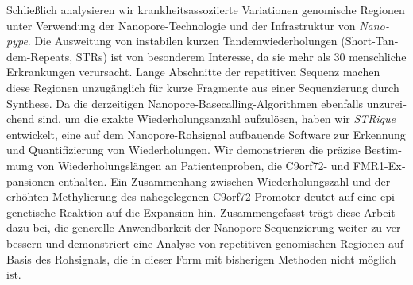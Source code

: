 \begin{otherlanguage}{german}
Schließlich analysieren wir krankheitsassoziierte Variationen genomische Regionen unter Verwendung der Nanopore-Technologie und der Infrastruktur von \textit{Nanopype}.
Die Ausweitung von instabilen kurzen Tandemwiederholungen (Short-Tandem-Repeats, STRs) ist von besonderem Interesse, da sie mehr als 30 menschliche Erkrankungen verursacht.
Lange Abschnitte der repetitiven Sequenz machen diese Regionen unzugänglich für kurze Fragmente aus einer Sequenzierung durch Synthese.
Da die derzeitigen Nanopore-Basecalling-Algorithmen ebenfalls unzureichend sind, um die exakte Wiederholungsanzahl aufzulösen, haben wir \textit{STRique} entwickelt, eine auf dem Nanopore-Rohsignal aufbauende Software zur Erkennung und Quantifizierung von Wiederholungen.
Wir demonstrieren die präzise Bestimmung von Wiederholungslängen an Patientenproben, die C9orf72- und FMR1-Expansionen enthalten.
Ein Zusammenhang zwischen Wiederholungszahl und der erhöhten Methylierung des nahegelegenen C9orf72 Promoter deutet auf eine epigenetische Reaktion auf die Expansion hin.
Zusammengefasst trägt diese Arbeit dazu bei, die generelle Anwendbarkeit der Nanopore-Sequenzierung weiter zu verbessern und demonstriert eine Analyse von repetitiven genomischen Regionen auf Basis des Rohsignals, die in dieser Form mit bisherigen Methoden nicht möglich ist.
\end{otherlanguage}


